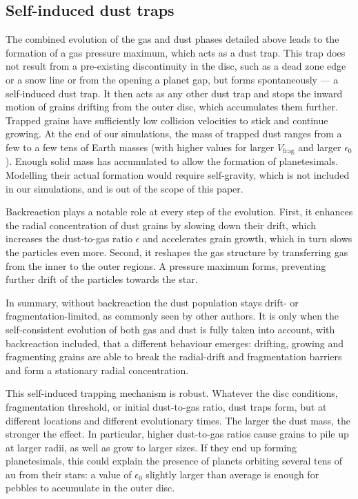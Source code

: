 \documentclass[a4paper,fleqn,usenatbib]{mnras}
\newcommand{\Vfrag}{V_\mathrm{frag}}  %
\begin{document}
\subsection{Self-induced dust traps}
\label{sec:SIDT}

The combined evolution of the gas and dust phases detailed above leads to the formation of a gas pressure maximum, which acts as a dust trap. This trap does not result from a pre-existing discontinuity in the disc, such as a dead zone edge or a snow line or from the opening a planet gap, but forms spontaneously --- a self-induced dust trap. It then acts as any other dust trap and stops the inward motion of grains drifting from the outer disc, which accumulates them further. Trapped grains have sufficiently low collision velocities to stick and continue growing. At the end of our simulations, the mass of trapped dust ranges from a few to a few tens of Earth masses (with higher values for larger $\Vfrag$ and larger $\epsilon_0$). Enough solid mass has accumulated to allow the formation of planetesimals. Modelling their actual formation would require self-gravity, which is not included in our simulations, and is out of the scope of this paper.

Backreaction plays a notable role at every step of the evolution. First, it enhances the radial concentration of dust grains by slowing down their drift, which increases the dust-to-gas ratio $\epsilon$ and accelerates grain growth, which in turn slows the particles even more. Second, it reshapes the gas structure by transferring gas from the inner to the outer regions. A pressure maximum forms, preventing further drift of the particles towards the star.

In summary, without backreaction the dust population stays drift- or fragmentation-limited, as commonly seen by other authors. It is only when the self-consistent evolution of both gas and dust is fully taken into account, with backreaction included, that a different behaviour emerges: drifting, growing and fragmenting grains are able to break the radial-drift and fragmentation barriers and form a stationary radial concentration.

This self-induced trapping mechanism is robust. Whatever the disc conditions, fragmentation threshold, or initial dust-to-gas ratio, dust traps form, but at different locations and different evolutionary times. The larger the dust mass, the stronger the effect. In particular, higher dust-to-gas ratios cause grains to pile up at larger radii, as well as grow to larger sizes. If they end up forming planetesimals, this could explain the presence of planets orbiting several tens of au from their stars: a value of $\epsilon_0$ slightly larger than average is enough for pebbles to accumulate in the outer disc.
\end{document}
